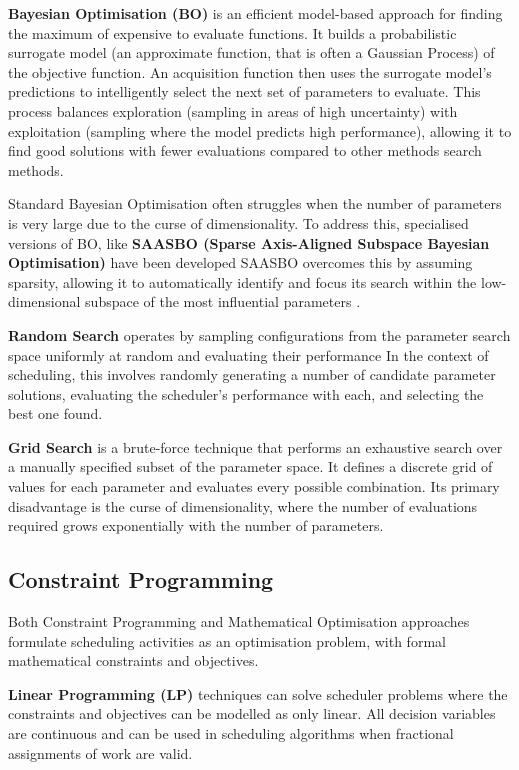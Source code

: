 \textbf{Bayesian Optimisation (BO)} is an efficient model-based approach for finding the maximum of expensive to evaluate functions.
It builds a probabilistic surrogate model (an approximate function, that is often a Gaussian Process) of the objective function.
An acquisition function then uses the surrogate model's predictions to intelligently select the next set of parameters to evaluate.
This process balances exploration (sampling in areas of high uncertainty) with exploitation (sampling where the model predicts high performance), allowing it to find good solutions with fewer evaluations compared to other methods search methods.

Standard Bayesian Optimisation often struggles when the number of parameters is very large due to the curse of dimensionality.
To address this, specialised versions of BO, like \textbf{SAASBO (Sparse Axis-Aligned Subspace Bayesian Optimisation)} have been developed 
SAASBO overcomes this by assuming sparsity, allowing it to automatically identify and focus its search within the low-dimensional subspace of the most influential parameters \autocite{erikssonHighDimensionalBayesianOptimization2021}.

\textbf{Random Search} operates by sampling configurations from the parameter search space uniformly at random and evaluating their performance
In the context of scheduling, this involves randomly generating a number of candidate parameter solutions, evaluating the scheduler's performance with each, and selecting the best one found.

\textbf{Grid Search} is a brute-force technique that performs an exhaustive search over a manually specified subset of the parameter space.
It defines a discrete grid of values for each parameter and evaluates every possible combination.
Its primary disadvantage is the curse of dimensionality, where the number of evaluations required grows exponentially with the number of parameters.

\subsection{Constraint Programming}
Both Constraint Programming and Mathematical Optimisation approaches formulate scheduling activities as an optimisation problem, with formal mathematical constraints and objectives.

\textbf{Linear Programming (LP)} techniques can solve scheduler problems where the constraints and objectives can be modelled as only linear.
All decision variables are continuous and can be used in scheduling algorithms when fractional assignments of work are valid.

